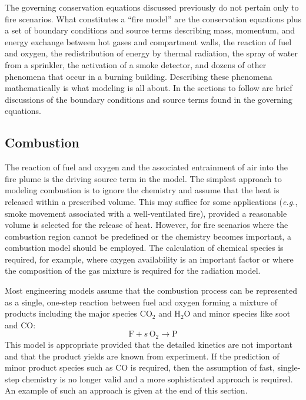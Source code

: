 \documentclass[graybox]{svmult}
\begin{document}
The governing conservation equations discussed previously do not pertain only to fire scenarios. What constitutes a ``fire model'' are the conservation equations plus a set of boundary conditions and source terms describing mass, momentum, and energy exchange between hot gases and compartment walls, the reaction of fuel and oxygen, the redistribution of energy by thermal radiation, the spray of water from a sprinkler, the activation of a smoke detector, and dozens of other phenomena that occur in a burning building. Describing these phenomena mathematically is what modeling is all about. In the sections to follow are brief discussions of the boundary conditions and source terms found in the governing equations.

\subsection{Combustion}

The reaction of fuel and oxygen and the associated entrainment of air into the fire plume is the driving source term in the model. The simplest approach to modeling combustion is to ignore the chemistry and assume that the heat is released within a prescribed volume. This may suffice for some applications ({\em e.g.}, smoke movement associated with a well-ventilated fire), provided a reasonable volume is selected for the release of heat. However, for fire scenarios where the combustion region cannot be predefined or the chemistry becomes important, a combustion model should be employed. The calculation of chemical species is required, for example, where oxygen availability is an important factor or where the composition of the gas mixture is required for the radiation model.

Most engineering models assume that the combustion process can be represented as a single, one-step reaction between fuel and oxygen forming a mixture of products including the major species CO$_2$ and H$_2$O and minor species like soot and CO:
\begin{equation}
\mathrm{F} + s \, \mathrm{O_2} \rightarrow \mathrm{P}
\label{eq:simplereac}
\end{equation}
This model is appropriate provided that the detailed kinetics are not important and that the product yields are known from experiment. If the prediction of minor product species such as CO is required, then the assumption of fast, single-step chemistry is no longer valid and a more sophisticated approach is required. An example of such an approach is given at the end of this section.
\end{document}
